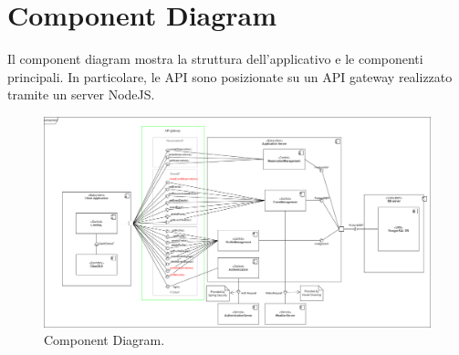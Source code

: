 \section{Component Diagram} 
Il component diagram mostra la struttura dell'applicativo e le componenti principali. In particolare, le API sono posizionate su un API gateway realizzato tramite un server NodeJS.
\begin{figure}[h!]
	\centering
	\includegraphics[width=1\textwidth]{Iterazione 3/images/Component.drawio.png}
	\caption{Component Diagram.}
	\label{fig:ComponentDiagramIt3}
\end{figure}

